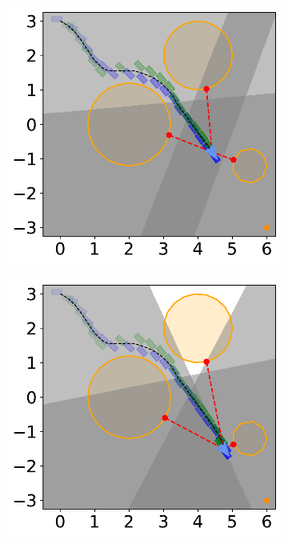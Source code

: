\begin{figure}[H]
    \begin{subfigure}{0.35\textwidth}
        \centering
        \includegraphics[width=\textwidth]{figures/Simulations/sim1circles_delta/frame_6.pdf}
    \end{subfigure}%
    \hfil
    \begin{subfigure}{0.35\textwidth}
        \centering
        \includegraphics[width=\textwidth]{figures/Simulations/sim1circles_delta/frame_7.pdf}
    \end{subfigure}%


\end{figure}
